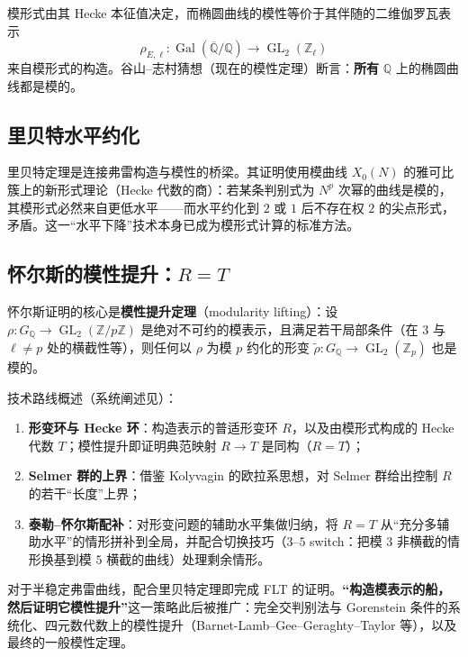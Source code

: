 模形式由其 Hecke 本征值决定，而椭圆曲线的模性等价于其伴随的二维伽罗瓦表示
\begin{equation}
    \rho_{E,\ell} : \operatorname{Gal}(\overline{\mathbb{Q}}/\mathbb{Q}) \to \operatorname{GL}_2(\mathbb{Z}_\ell)
\end{equation}
来自模形式的构造。谷山--志村猜想（现在的模性定理）断言：\textbf{所有} $\mathbb{Q}$ 上的椭圆曲线都是模的。

\subsection{里贝特水平约化}

里贝特定理是连接弗雷构造与模性的桥梁。其证明使用模曲线 $X_0(N)$ 的雅可比簇上的新形式理论（Hecke 代数的商）：若某条判别式为 $N^p$ 次幂的曲线是模的，其模形式必然来自更低水平——而水平约化到 $2$ 或 $1$ 后不存在权 $2$ 的尖点形式，矛盾。这一“水平下降”技术本身已成为模形式计算的标准方法。

\subsection{怀尔斯的模性提升：$R = T$}

怀尔斯证明的核心是\textbf{模性提升定理}（modularity lifting）：设 $\rho: G_{\mathbb{Q}} \to \operatorname{GL}_2(\mathbb{Z}/p\mathbb{Z})$ 是绝对不可约的模表示，且满足若干局部条件（在 $3$ 与 $\ell \ne p$ 处的横截性等），则任何以 $\rho$ 为模 $p$ 约化的形变 $\tilde{\rho}: G_{\mathbb{Q}} \to \operatorname{GL}_2(\mathbb{Z}_p)$ 也是模的。

技术路线概述（系统阐述见\cite{cornell1997modular}）：

\begin{enumerate}[label=(\arabic*)]
    \item \textbf{形变环与 Hecke 环}：构造表示的普适形变环 $R$，以及由模形式构成的 Hecke 代数 $T$；模性提升即证明典范映射 $R \to T$ 是同构（$R = T$）；
    \item \textbf{Selmer 群的上界}：借鉴 Kolyvagin 的欧拉系思想，对 Selmer 群给出控制 $R$ 的若干“长度”上界；
    \item \textbf{泰勒--怀尔斯配补}：对形变问题的辅助水平集做归纳，将 $R = T$ 从“充分多辅助水平”的情形拼补到全局，并配合切换技巧（$3$--$5$ switch：把模 $3$ 非横截的情形换基到模 $5$ 横截的曲线）处理剩余情形。
\end{enumerate}

对于半稳定弗雷曲线，配合里贝特定理即完成 FLT 的证明。\textbf{“构造模表示的船，然后证明它模性提升”}这一策略此后被推广：完全交判别法与 Gorenstein 条件的系统化、四元数代数上的模性提升（Barnet-Lamb--Gee--Geraghty--Taylor 等），以及最终的一般模性定理\cite{breuil2001modularity}。
